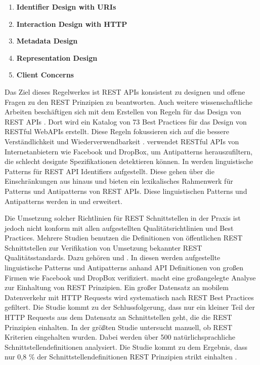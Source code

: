 \newpage
\begin{enumerate}
  \item \textbf{Identifier Design with \acs{URI}s}
  \item \textbf{Interaction Design with \acs{HTTP}}
  \item \textbf{Metadata Design}
  \item \textbf{Representation Design}
  \item \textbf{Client Concerns}
\end{enumerate}

Das Ziel dieses Regelwerkes ist \acs{REST} \acs{API}s konsistent zu designen und offene Fragen zu den \acs{REST} Prinzipien zu beantworten. Auch weitere wissenschaftliche Arbeiten beschäftigen sich mit dem Erstellen von Regeln für das Design von \acs{REST} \acs{API}s \parencite{petrillo_are_2016}. Dort wird ein Katalog von 73 Best Practices für das Design von \acs{REST}ful Web\acs{API}s erstellt. Diese Regeln fokussieren sich auf die bessere Verständlichkeit und Wiederverwendbarkeit \parencite{petrillo_are_2016}. \parencite{palma_detection_2014} verwendet \acs{REST}ful \acs{API}s von Internetanbietern wie Facebook und DropBox, um Antipatterns herauszufiltern, die schlecht designte Spezifikationen detektieren können. In \parencite{palma_are_2015} werden linguistische Patterns für \acs{REST} \acs{API} Identifiers aufgestellt. Diese gehen über die Einschränkungen aus \parencite{masse_rest_2011} hinaus und bieten ein lexikalisches Rahmenwerk für Patterns und Antipatterns von \acs{REST} \acs{API}s. Diese linguistischen Patterns und Antipatterns werden in \parencite{palma_semantic_2017} und \parencite{palma_assessing_2022} erweitert. 

Die Umsetzung solcher Richtlinien für \acs{REST} Schnittstellen in der Praxis ist jedoch nicht konform mit allen aufgestellten Qualitätsrichtlinien und Best Practices. Mehrere Studien benutzen die Definitionen von öffentlichen \acs{REST} Schnittstellen zur Verifikation von Umsetzung bekannter \acs{REST} Qualitätsstandards. Dazu gehören \parencite{palma_detection_2014} und \parencite{palma_semantic_2017}. In diesen werden aufgestellte linguistische Patterns und Antipatterns anhand \acs{API} Definitionen von großen Firmen wie Facebook und DropBox verifiziert. \parencite{rodriguez_rest_2016} macht eine großangelegte Analyse zur Einhaltung von \acs{REST} Prinzipien. Ein großer Datensatz an mobilem Datenverkehr mit \acs{HTTP} Requests wird systematisch nach \acs{REST} Best Practices gefiltert. Die Studie kommt zu der Schlussfolgerung, dass nur ein kleiner Teil der \acs{HTTP} Requests aus dem Datensatz an Schnittstellen geht, die die \acs{REST} Prinzipien einhalten. In der größten Studie untersucht \parencite{neumann_analysis_2021} manuell, ob \acs{REST} Kriterien eingehalten wurden. Dabei werden über 500 natürlichsprachliche Schnittstellendefinitionen analysiert. Die Studie kommt zu dem Ergebnis, dass nur 0,8 \% der Schnittstellendefinitionen \acs{REST} Prinzipien strikt einhalten \parencite{neumann_api_2017}. 

